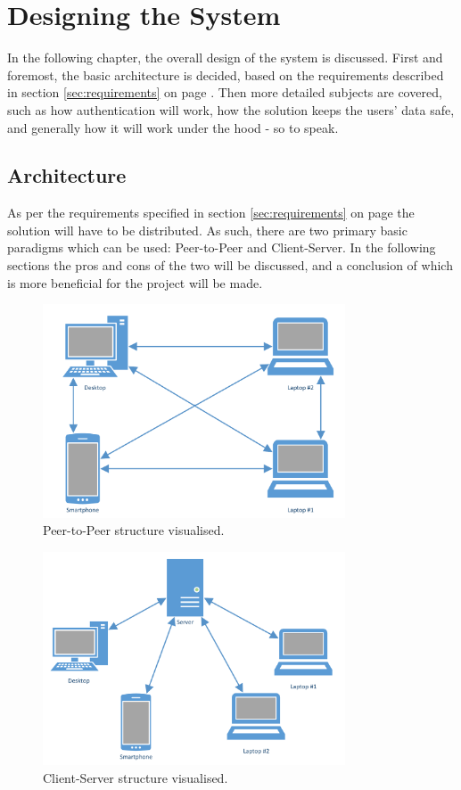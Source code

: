 \chapter{Designing the System}
	In the following chapter, the overall design of the system is discussed. First and foremost, the basic architecture is decided, based on the requirements described in section \ref{sec:requirements} on page \pageref{sec:requirements}. Then more detailed subjects are covered, such as how authentication will work, how the solution keeps the users' data safe, and generally how it will work under the hood - so to speak.

	\section{Architecture}
		\label{sec:arch}
		As per the requirements specified in section \ref{sec:requirements} on page \pageref{sec:requirements} the solution will have to be distributed. As such, there are two primary basic paradigms which can be used: Peer-to-Peer and Client-Server. In the following sections the pros and cons of the two will be discussed, and a conclusion of which is more beneficial for the project will be made.

		\begin{figure}[p]
			\centering
			\includegraphics[width=0.8\textwidth]{figures/design/PeerToPeer.pdf}
			\caption{Peer-to-Peer structure visualised.}
			\label{fig:peertopeer}
		\end{figure}

		\begin{figure}[p]
			\centering
			\includegraphics[width=0.8\textwidth]{figures/design/ClientServer.pdf}
			\caption{Client-Server structure visualised.}
			\label{fig:clientserver}
		\end{figure}


